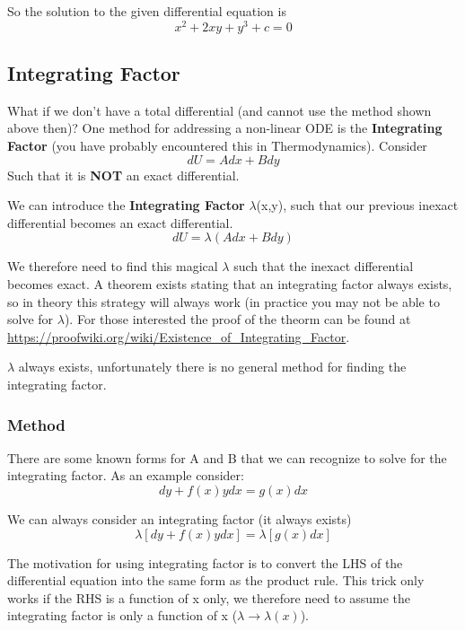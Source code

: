 \documentclass{article}
\newcommand{\be}{\begin{equation}}
\newcommand{\ee}{\end{equation}}
\begin{document}
So the solution to the given differential equation is 
\be
x^2 + 2xy + y^3 + c = 0
\ee

\subsection*{Integrating Factor}
What if we don't have a total differential (and cannot use the method shown above then)?
One method for addressing a non-linear ODE is the \textbf{Integrating Factor} (you have probably encountered this in Thermodynamics). 
Consider 
\be
dU = Adx + Bdy
\ee
Such that it is \textbf{NOT} an exact differential.

We can introduce the \textbf{Integrating Factor} $\lambda$(x,y), such that our previous inexact differential becomes an exact differential. 
\be
dU = \lambda(Adx + Bdy)
\ee

We therefore need to find this magical $\lambda$ such that the inexact differential becomes exact.
A theorem exists stating that an integrating factor always exists, so in theory this strategy will always work (in practice you may not be able to solve for $\lambda$). 
For those interested the proof of the theorm can be found at \url{https://proofwiki.org/wiki/Existence_of_Integrating_Factor}. 

$\lambda$ always exists, unfortunately there is no general method for finding the integrating factor.

\subsubsection*{Method}
There are some known forms for A and B that we can recognize to solve for the integrating factor. As an example consider:
\be
dy + f(x) y dx = g(x) dx
\ee

We can always consider an integrating factor (it always exists)
\be
\lambda \left[dy + f(x) y dx\right] = \lambda \left[g(x) dx\right]
\ee

The motivation for using integrating factor is to convert the LHS of the differential equation into the same form as the product rule. 
This trick only works if the RHS is a function of x only, we therefore need to assume the integrating factor is only a function of x ($\lambda \rightarrow \lambda(x)$). 
\end{document}
